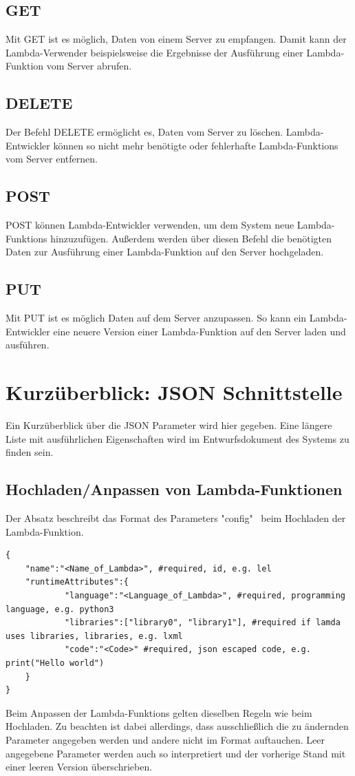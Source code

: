 \documentclass[a4paper,20pt,oneside]{book}
\begin{document}
\subsection{GET}
Mit GET ist es möglich, Daten von einem \Gls{Server} zu empfangen. Damit kann der \Gls{Lambda-Verwender} beispielsweise die Ergebnisse der Ausführung einer \Gls{Lambda-Funktion} vom Server abrufen.
\subsection{DELETE}
Der Befehl DELETE ermöglicht es, Daten vom Server zu löschen. \Gls{Lambda-Entwickler} können so nicht mehr benötigte oder fehlerhafte \Glspl{Lambda-Funktion} vom Server entfernen.
\subsection{POST}
POST können \Gls{Lambda-Entwickler} verwenden, um dem System neue \Glspl{Lambda-Funktion} hinzuzufügen. Außerdem werden über diesen Befehl die benötigten Daten zur Ausführung einer \Gls{Lambda-Funktion} auf den Server hochgeladen.
\subsection{PUT}
Mit PUT ist es möglich Daten auf dem Server anzupassen. So kann ein \Gls{Lambda-Entwickler} eine neuere Version einer \gls{Lambda-Funktion} auf den Server laden und ausführen. 




\section{Kurzüberblick: JSON Schnittstelle}
Ein Kurzüberblick über die JSON Parameter wird hier gegeben. Eine längere Liste mit ausführlichen Eigenschaften wird im Entwurfsdokument des Systems zu finden sein.

\subsection{Hochladen/Anpassen von Lambda-Funktionen}
Der Absatz beschreibt das Format des Parameters "config" \ beim Hochladen der \gls{Lambda-Funktion}.
\begin{lstlisting}
{
	"name":"<Name_of_Lambda>", #required, id, e.g. lel
	"runtimeAttributes":{
			"language":"<Language_of_Lambda>", #required, programming language, e.g. python3
			"libraries":["library0", "library1"], #required if lamda uses libraries, libraries, e.g. lxml
			"code":"<Code>" #required, json escaped code, e.g. print("Hello world")
	}
}	
\end{lstlisting}
Beim Anpassen der \glspl{Lambda-Funktion} gelten dieselben Regeln wie beim Hochladen. 
Zu beachten ist dabei allerdings, dass ausschließlich die zu ändernden Parameter angegeben werden und andere nicht im Format auftauchen. Leer angegebene Parameter werden auch so interpretiert und der vorherige Stand mit einer leeren Version überschrieben.
\end{document}
